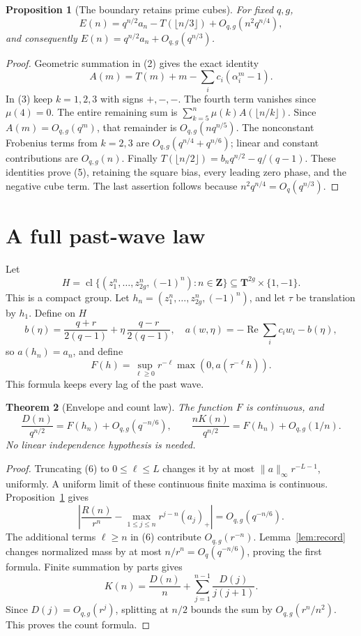 \documentclass[11pt]{article}
\newtheorem{theorem}{Theorem}[section]
\newtheorem{proposition}[theorem]{Proposition}
\newcommand{\T}{\mathbf T}
\newcommand{\Z}{\mathbf Z}
\newcommand{\Real}{\operatorname{Re}}
\newcommand{\cl}{\operatorname{cl}}
\begin{document}
\begin{proposition}[The boundary retains prime cubes]\label{prop:expansion}
For fixed \(q,g\),
\[
 E(n)=q^{n/2}a_n-T(\lfloor n/3\rfloor)
       +O_{q,g}(n^2q^{n/4}),                      \tag{5}\label{eq:cubes}
\]
and consequently \(E(n)=q^{n/2}a_n+O_{q,g}(q^{n/3})\).
\end{proposition}
\begin{proof}
Geometric summation in (2) gives the exact identity
\[
 A(m)=T(m)+m-\sum_i c_i(\alpha_i^m-1).
\]
In (3) keep \(k=1,2,3\) with signs \(+,-,-\).
The fourth term vanishes since \(\mu(4)=0\). The entire remaining
sum is \(\sum_{k=5}^n\mu(k)A(\lfloor n/k\rfloor)\). Since
\(A(m)=O_{q,g}(q^m)\), that remainder is \(O_{q,g}(nq^{n/5})\).
The nonconstant Frobenius terms from \(k=2,3\) are
\(O_{q,g}(q^{n/4}+q^{n/6})\); linear and constant contributions are
\(O_{q,g}(n)\). Finally
\(T(\lfloor n/2\rfloor)=b_nq^{n/2}-q/(q-1)\).
These identities prove (5), retaining the square bias, every leading
zero phase, and the negative cube term. The last assertion follows
because \(n^2q^{n/4}=O_q(q^{n/3})\).
\end{proof}

\section{A full past-wave law}
Let
\[
 H=\cl\{(z_1^n,\ldots,z_{2g}^n,(-1)^n):n\in\Z\}
       \subseteq\T^{2g}\times\{1,-1\}.
\]
This is a compact group. Let \(h_n=(z_1^n,\ldots,z_{2g}^n,(-1)^n)\),
and let \(\tau\) be translation by \(h_1\). Define on \(H\)
\[
 b(\eta)=\frac{q+r}{2(q-1)}
              +\eta\,\frac{q-r}{2(q-1)},\quad
 a(w,\eta)=-\Real\sum_i c_iw_i-b(\eta),
\]
so \(a(h_n)=a_n\), and define
\[
 F(h)=\sup_{\ell\geq0}r^{-\ell}
             \max(0,a(\tau^{-\ell}h)).            \tag{6}\label{eq:envelope}
\]
This formula keeps every lag of the past wave.

\begin{theorem}[Envelope and count law]\label{thm:wave}
The function \(F\) is continuous, and
\[
 \frac{D(n)}{q^{n/2}}=F(h_n)+O_{q,g}(q^{-n/6}),\qquad
 \frac{nK(n)}{q^{n/2}}=F(h_n)+O_{q,g}(1/n).       \tag{7}\label{eq:law}
\]
No linear independence hypothesis is needed.
\end{theorem}
\begin{proof}
Truncating (6) to \(0\leq\ell\leq L\) changes it by at most
\(\|a\|_\infty r^{-L-1}\), uniformly. A uniform limit of these
continuous finite maxima is continuous.
Proposition~\ref{prop:expansion} gives
\[
 \left|\frac{R(n)}{r^n}
  -\max_{1\leq j\leq n}r^{j-n}(a_j)_+\right|
       =O_{q,g}(q^{-n/6}).
\]
The additional terms \(\ell\geq n\) in (6) contribute
\(O_{q,g}(r^{-n})\). Lemma~\ref{lem:record} changes normalized mass
by at most \(n/r^n=O_q(q^{-n/6})\), proving the first formula.
Finite summation by parts gives
\[
 K(n)=\frac{D(n)}n+
        \sum_{j=1}^{n-1}\frac{D(j)}{j(j+1)}.       \tag{8}\label{eq:Abel}
\]
Since \(D(j)=O_{q,g}(r^j)\), splitting at \(n/2\) bounds the sum
by \(O_{q,g}(r^n/n^2)\). This proves the count formula.
\end{proof}
\end{document}
